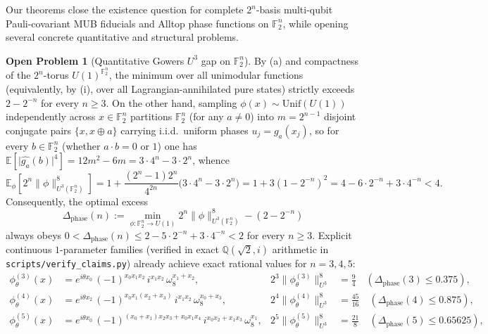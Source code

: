 \documentclass[11pt,a4paper]{article}
\theoremstyle{plain}
\theoremstyle{definition}
\newtheorem{openproblem}{Open Problem}
\theoremstyle{remark}
\newcommand{\Q}{\mathbb{Q}}
\newcommand{\F}{\mathbb{F}}
\newcommand{\Uone}{U(1)}
\newcommand{\abs}[1]{\lvert#1\rvert}
\newcommand{\norm}[1]{\lVert#1\rVert}
\numberwithin{equation}{section}
\begin{document}
Our theorems close the existence question for complete $2^n$-basis multi-qubit Pauli-covariant MUB fiducials and Alltop phase functions on $\F_2^n$, while opening several concrete quantitative and structural problems.

\begin{openproblem}[Quantitative Gowers $U^3$ gap on $\F_2^n$]\label{op:gowers-gap}
By (a) and compactness of the $2^n$-torus $\Uone^{\F_2^n}$, the minimum over all unimodular functions (equivalently, by (i), over all Lagrangian-annihilated pure states) strictly exceeds $2 - 2^{-n}$ for every $n \ge 3$. On the other hand, sampling $\phi(x) \sim \mathrm{Unif}(\Uone)$ independently across $x \in \F_2^n$ partitions $\F_2^n$ (for any $a \neq 0$) into $m = 2^{n-1}$ disjoint conjugate pairs $\{x, x \oplus a\}$ carrying i.i.d.\ uniform phases $u_j = g_a(x_j)$, so for every $b \in \F_2^n$ (whether $a \cdot b = 0$ or $1$) one has $\mathbb{E}[\abs{\widehat{g_a}(b)}^4] = 12 m^2 - 6 m = 3 \cdot 4^n - 3 \cdot 2^n$, whence
\[
  \mathbb{E}_{\phi}\!\left[2^n \norm{\phi}_{U^3(\F_2^n)}^8\right]
  = 1 + \frac{(2^n - 1) 2^n}{4^{2n}}\bigl(3 \cdot 4^n - 3 \cdot 2^n\bigr)
  = 1 + 3(1 - 2^{-n})^2
  = 4 - 6\cdot 2^{-n} + 3\cdot 4^{-n} < 4.
\]
Consequently, the optimal excess
\[
  \Delta_{\mathrm{phase}}(n) := \min_{\phi : \F_2^n \to \Uone} 2^n \norm{\phi}_{U^3(\F_2^n)}^8 - (2 - 2^{-n})
\]
always obeys $0 < \Delta_{\mathrm{phase}}(n) \le 2 - 5\cdot 2^{-n} + 3\cdot 4^{-n} < 2$ for every $n \ge 3$. Explicit continuous $1$-parameter families (verified in exact $\Q(\sqrt{2}, i)$ arithmetic in \texttt{\small scripts/\allowbreak verify\_claims.py}) already achieve exact rational values for $n = 3, 4, 5$:
\begin{align*}
  \phi^{(3)}_\theta(x) &= e^{i\theta x_0}\,(-1)^{x_0 x_1 x_2}\, i^{x_1 x_2}\,\omega_8^{x_1 + x_2}, &
  2^3\norm{\phi^{(3)}_\theta}_{U^3}^8 &= \frac{9}{4} \quad (\Delta_{\mathrm{phase}}(3) \le 0.375), \\
  \phi^{(4)}_\theta(x) &= e^{i\theta x_2}\,(-1)^{x_0 x_1(x_2+x_3)}\, i^{x_1 x_2}\,\omega_8^{x_0 + x_3}, &
  2^4\norm{\phi^{(4)}_\theta}_{U^3}^8 &= \frac{45}{16} \quad (\Delta_{\mathrm{phase}}(4) \le 0.875), \\
  \phi^{(5)}_\theta(x) &= e^{i\theta x_0}\,(-1)^{(x_0+x_1)x_2 x_3 + x_0 x_1 x_4}\, i^{x_0 x_2 + x_1 x_3}\,\omega_8^{x_1}, &
  2^5\norm{\phi^{(5)}_\theta}_{U^3}^8 &= \frac{21}{8} \quad (\Delta_{\mathrm{phase}}(5) \le 0.65625),
\end{align*}

\end{openproblem}
\end{document}
